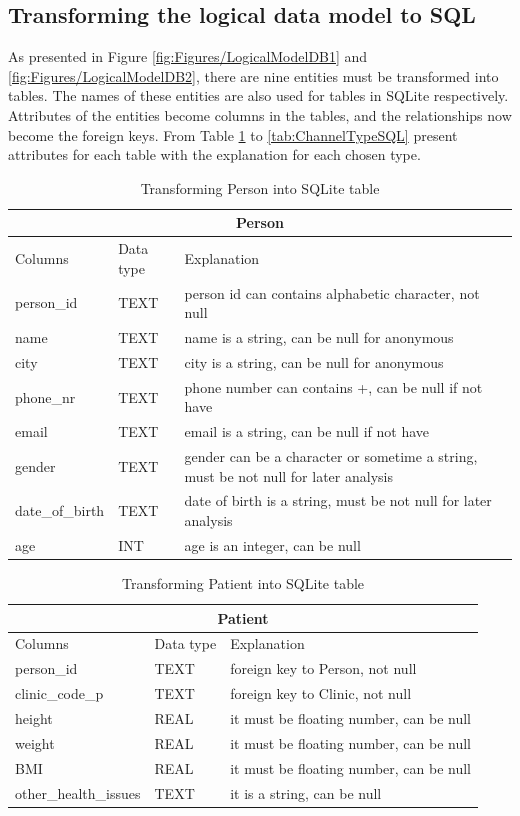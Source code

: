 \subsection{Transforming the logical data model to SQL}
As presented in Figure \ref{fig:Figures/LogicalModelDB1} and \ref{fig:Figures/LogicalModelDB2}, there are nine entities must be transformed into tables. The names of these entities are also used for tables in SQLite respectively. Attributes of the entities become columns in the tables, and the relationships now become the foreign keys.
From Table \ref{tab:PersonTypeSQL} to \ref{tab:ChannelTypeSQL} present attributes for each table with the explanation for each chosen type.
\begin{table}
\begin{center}
\begin{tabular}{ |p{4cm}|p{1.8cm}|p{6.2cm}|  }
 \hline
 \multicolumn{3}{|c|}{Person} \\
 \hline
 Columns& Data type & Explanation \\
 \hline
 person\_id& TEXT& person id can contains alphabetic character, not null\\
 name& TEXT& name is a string, can be null for anonymous\\
 city& TEXT& city is a string, can be null for anonymous\\
 phone\_nr& TEXT& phone number can contains +, can be null if not have\\
 email& TEXT& email is a string, can be null if not have\\
 gender& TEXT& gender can be a character or sometime a string, must be not null for later analysis\\
 date\_of\_birth& TEXT& date of birth is a string, must be not null for later analysis\\
 age& INT& age is an integer, can be null\\
 \hline
\end{tabular}
\end{center}
\caption{Transforming Person into SQLite table}
\label{tab:PersonTypeSQL}
\end{table}
\begin{table}
\begin{center}
\begin{tabular}{ |p{4cm}|p{1.8cm}|p{6.2cm}|  }
 \hline
 \multicolumn{3}{|c|}{Patient} \\
 \hline
 Columns& Data type & Explanation \\
 \hline
 person\_id& TEXT& foreign key to Person, not null\\
 clinic\_code\_p& TEXT& foreign key to Clinic, not null\\
 height& REAL& it must be floating number, can be null\\
 weight& REAL& it must be floating number, can be null\\
 BMI& REAL& it must be floating number, can be null\\
 other\_health\_issues& TEXT& it is a string, can be null\\
 \hline
\end{tabular}
\end{center}
\caption{Transforming Patient into SQLite table}
\label{tab:PatientTypeSQL}
\end{table}
